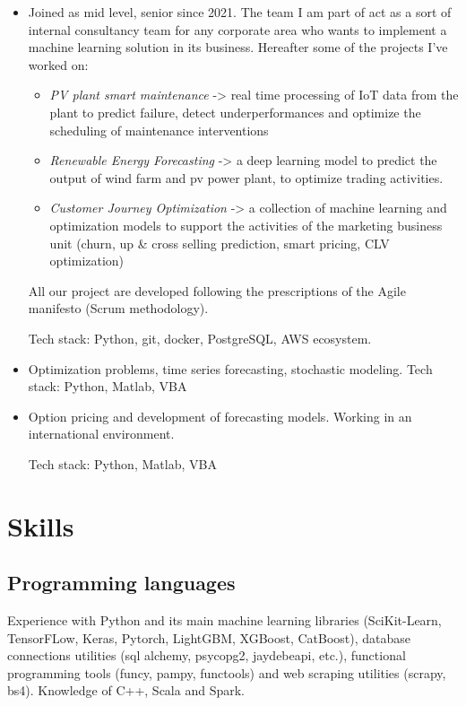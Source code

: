 \documentclass[11pt,a4paper,sans]{moderncv}        %
\begin{document}
\begin{itemize}
\item{
Joined as mid level, senior since 2021. The team I am part of act as a sort of internal consultancy team for any corporate area who wants to implement a machine learning solution in its business. Hereafter some of the projects I've worked on:
\smallskip
\begin{itemize}
\item{\emph{PV plant smart maintenance} -> real time processing of IoT data from the plant to predict failure, detect underperformances and optimize the scheduling of maintenance interventions}
\item{\emph{Renewable Energy Forecasting} -> a deep learning model to predict the output of wind farm and pv power plant, to optimize trading activities.}
\item{\emph{Customer Journey Optimization} -> a collection of machine learning and optimization models to support the activities of the marketing business unit (churn, up \& cross selling prediction, smart pricing, CLV optimization)}
\end{itemize} 
\smallskip
All our project are developed following the prescriptions of the Agile manifesto (Scrum methodology). 

Tech stack: Python, git, docker, PostgreSQL, AWS ecosystem.}
\item{
Optimization problems, time series forecasting, stochastic modeling. Tech stack: Python, Matlab, VBA}
\item{
Option pricing and development of forecasting models. Working in an international environment.

Tech stack: Python, Matlab, VBA}
\end{itemize}

\section{Skills}
\subsection{Programming languages}
Experience with Python and its main machine learning libraries (SciKit-Learn, TensorFLow, Keras, Pytorch, LightGBM, XGBoost, CatBoost), database connections utilities (sql alchemy, psycopg2, jaydebeapi, etc.), functional programming tools (funcy, pampy, functools) and web scraping utilities (scrapy, bs4). Knowledge of C++, Scala and Spark.
\end{document}
